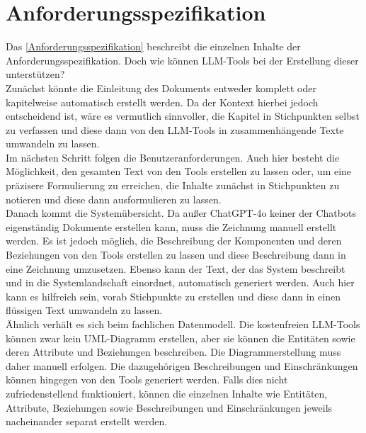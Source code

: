 \section{Anforderungsspezifikation}  \label{LLMAnforderungsspezifikation}

Das \autoref{Anforderungsspezifikation} beschreibt die einzelnen Inhalte der Anforderungsspezifikation. Doch wie 
können LLM-Tools bei der Erstellung dieser unterstützen?\\

Zunächst könnte die Einleitung des Dokuments entweder komplett oder kapitelweise automatisch erstellt werden. Da der 
Kontext hierbei jedoch entscheidend ist, wäre es vermutlich sinnvoller, die Kapitel in Stichpunkten selbst zu 
verfassen und diese dann von den LLM-Tools in zusammenhängende Texte umwandeln zu lassen.\\

Im nächsten Schritt folgen die Benutzeranforderungen. Auch hier besteht die Möglichkeit, den gesamten Text von den 
Tools erstellen zu lassen oder, um eine präzisere Formulierung zu erreichen, die Inhalte zunächst in Stichpunkten zu 
notieren und diese dann ausformulieren zu lassen.\\

Danach kommt die Systemübersicht. Da außer ChatGPT-4o keiner der Chatbots eigenständig Dokumente erstellen kann, 
muss die Zeichnung manuell erstellt werden. Es ist jedoch möglich, die Beschreibung der Komponenten und deren 
Beziehungen von den Tools erstellen zu lassen und diese Beschreibung dann in eine Zeichnung umzusetzen. Ebenso 
kann der Text, der das System beschreibt und in die Systemlandschaft einordnet, automatisch generiert werden. Auch 
hier kann es hilfreich sein, vorab Stichpunkte zu erstellen und diese dann in einen flüssigen Text umwandeln zu lassen.\\

Ähnlich verhält es sich beim fachlichen Datenmodell. Die kostenfreien LLM-Tools können zwar kein UML-Diagramm erstellen, 
aber sie können die Entitäten sowie deren Attribute und Beziehungen beschreiben. Die Diagrammerstellung muss daher 
manuell erfolgen. Die dazugehörigen Beschreibungen und Einschränkungen können hingegen von den Tools generiert werden. 
Falls dies nicht zufriedenstellend funktioniert, können die einzelnen Inhalte wie Entitäten, Attribute, Beziehungen 
sowie Beschreibungen und Einschränkungen jeweils nacheinander separat erstellt werden.\\

